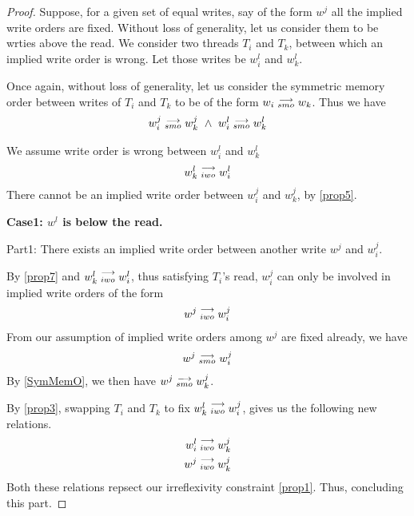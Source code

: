         \begin{proof}
            Suppose, for a given set of equal writes, say of the form $w^j$ all the implied write orders are fixed. Without loss of generality, let us consider them to be wrties above the read. We consider two threads $T_i$ and $T_k$, between which an implied write order is wrong. Let those writes be $w_i^l$ and $w_k^l$. 

            Once again, without loss of generality, let us consider the symmetric memory order between writes of $T_i$ and $T_k$ to be of the form $w_i\stackrel{\longrightarrow}{_{smo}}w_k$. Thus we have 
            \begin{align}
                \reln{w_i^j}{smo}{w_k^j} \ \wedge \ \reln{w_i^l}{smo}{w_k^l}
            \end{align}

            We assume write order is wrong between $w_i^l$ and $w_k^l$
            \begin{align}
                w_k^l\stackrel{\longrightarrow}{_{iwo}}w_i^l
            \end{align} 
            There cannot be an implied write order between $w_i^j$ and $w_k^j$, by \ref{prop5}. 

            \textbf{Case1: $w^l$ is below the read.}
            
                Part1: There exists an implied write order between another write $w^j$ and $w_i^j$. 

                    By \ref{prop7} and $w_k^l\stackrel{\longrightarrow}{_{iwo}}w_i^l$, thus satisfying $T_i$'s read, $w_i^j$ can only be involved in implied write orders of the form 
                    \begin{align}
                        w^j\stackrel{\longrightarrow}{_{iwo}}w_i^j
                    \end{align}
                    From our assumption of implied write orders among $w^j$ are fixed already, we have
                    \begin{align}
                        w^j\stackrel{\longrightarrow}{_{smo}}w_i^j 
                    \end{align} 
                    By \ref{SymMemO}, we then have $w^j\stackrel{\longrightarrow}{_{smo}}w_k^j$.

                    By \ref{prop3}, swapping $T_i$ and $T_k$ to fix $w_k^l\stackrel{\longrightarrow}{_{iwo}}w_i^j$, gives us the following new relations.
                    \begin{align}
                        w_i^l\stackrel{\longrightarrow}{_{iwo}}w_k^j \\
                        w^j\stackrel{\longrightarrow}{_{iwo}}w_k^j
                    \end{align}
                    Both these relations repsect our irreflexivity constraint \ref{prop1}. Thus, concluding this part. 
                    

\end{proof}
